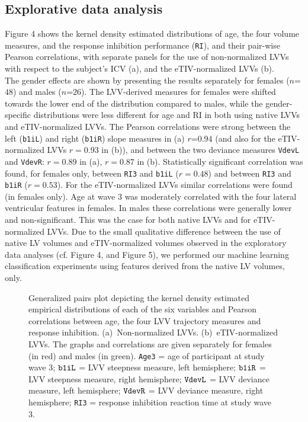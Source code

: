 \documentclass[10pt,letterpaper]{article}
\begin{document}
\subsection {Explorative data analysis}

Figure 4 shows the kernel density estimated distributions of age, the four volume measures, and the response inhibition performance ({\tt RI}), and their pair-wise Pearson correlations, with separate panels for the use of non-normalized LVVs with respect to the subject's ICV (a), and the eTIV-normalized LVVs (b). \\

The gender effects are shown by presenting the results separately for females ($n$=$48$) and males ($n$=$26$). The LVV-derived measures for females were shifted towards the lower end of the distribution compared to males, while the gender-specific distributions were less different for age and RI in both using native LVVs and eTIV-normalized LVVs.  The Pearson correlations were strong between the left ({\tt b1iL}) and right ({\tt b1iR}) slope measures in (a) $r$=$0.94$ (and also for the eTIV-normalized LVVs $r=0.93$ in (b)), and between the two deviance measures {\tt VdevL} and {\tt VdevR}: $r=0.89$ in (a), $r=0.87$ in (b). Statistically significant correlation was found, for females only, between {\tt RI3} and {\tt b1iL} ($r = 0.48$) and between {\tt RI3} and {\tt b1iR} ($r = 0.53$). For the eTIV-normalized LVVs similar correlations were found (in females only). Age at wave 3 was moderately correlated with the four lateral ventricular features in females. In males these correlations were generally lower and non-significant. This was the case for both native LVVs and for eTIV-normalized LVVs. Due to the small qualitative difference between the use of native LV volumes and eTIV-normalized volumes observed in the exploratory data analyses (cf. Figure 4, and Figure 5), we performed our machine learning classification experiments using features derived from the native LV volumes, only. \\
 
\vspace{3mm}
\begin{figure}[H]
\caption{
Generalized pairs plot depicting the kernel density estimated empirical distributions of each of the six variables and Pearson correlations between age, the four LVV trajectory measures and response inhibition. (a)~Non-normalized LVVs. (b)~eTIV-normalized LVVs. The graphs and correlations are given separately for females (in red) and males (in green). {\tt Age3} = age of participant at study wave 3; ${\tt b1iL}$ = LVV steepness measure, left hemisphere; ${\tt b1iR}$ = LVV steepness measure, right hemisphere; ${\tt VdevL}$ = LVV deviance measure, left hemisphere; ${\tt VdevR}$ = LVV deviance measure, right hemisphere; {\tt RI3} = response inhibition reaction time at study wave 3. \\}
\label{fig 4}
\end{figure}
\vspace{3mm}
\end{document}
